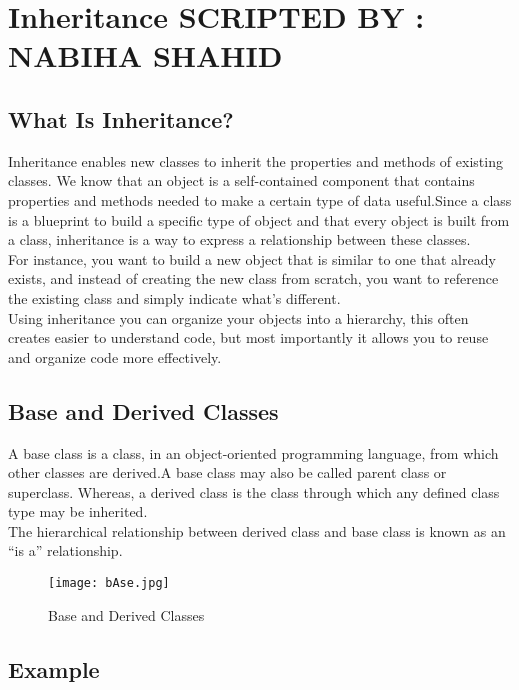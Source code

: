 \documentclass[11pt,fleqn]{book} %
\begin{document}

\chapter{Inheritance \hspace{65mm} {\textsc{\small SCRIPTED BY : NABIHA SHAHID}}}

\section{What Is Inheritance?}

Inheritance enables new classes to inherit the properties and methods of existing classes. We know that an object is a self-contained component that contains properties and methods needed to make a certain type of data useful.Since a class is a blueprint to build a specific type of object and that every object is built from a class, inheritance is a way to express a relationship between these classes.\\
For instance, you want to build a new object that is similar to one that already exists, and instead of creating the new class from scratch, you want to reference the existing class and simply indicate what's different.\\
Using inheritance you can organize your objects into a hierarchy, this often creates easier to understand code, but most importantly it allows you to reuse and organize code more effectively.

\section{Base and Derived Classes}

A base class is a class, in an object-oriented programming language, from which other classes are derived.A base class may also be called parent class or superclass. Whereas, a derived class is the class through which any defined class type may be inherited.\\
The hierarchical relationship between derived class and base class is known as an “is a” relationship.
\begin{figure}[h]
	\centering\texttt{[image: bAse.jpg]}
	\caption{Base and Derived Classes}
\end{figure}

\newpage
\section{Example}
\end{document}
